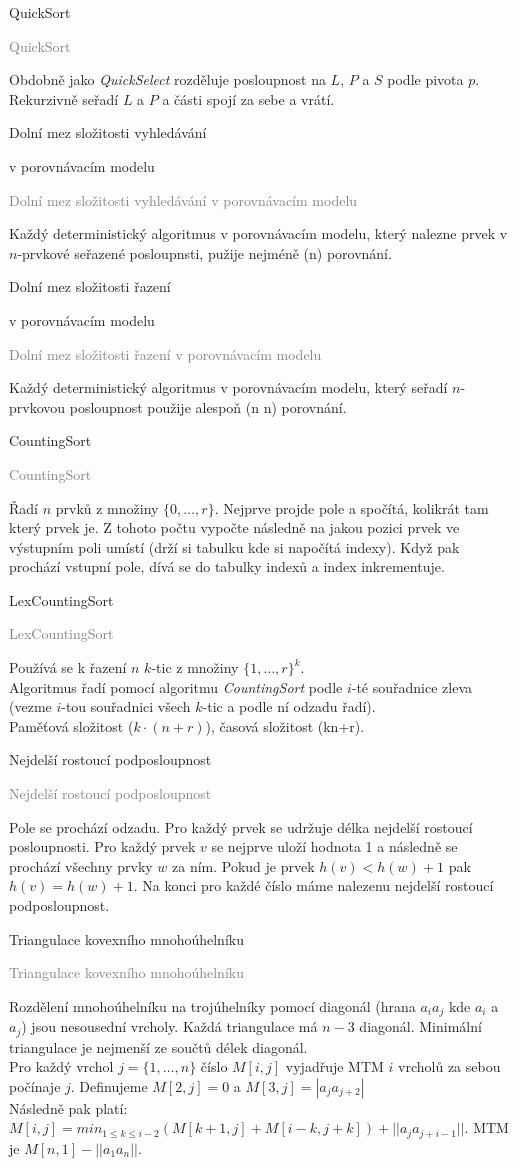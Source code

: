 \documentclass[20pt]{extarticle}
\newcommand{\card}[3][]{
	\vspace*{\fill}

	\newpage
	\topskip0pt
	\vspace*{\fill}
		\Large #2

		\vspace{1cm}
		\normalsize #1
	\vspace*{\fill}
	\newpage

	\small \textcolor{gray}{#2 #1}
	\topskip0pt
	\vspace*{\fill}

	\normalsize
	#3
	\vspace*{\fill}
}
\begin{document}
\begin{center}
\card{QuickSort}{
	Obdobně jako \textit{QuickSelect} rozděluje posloupnost na $L$, $P$ a $S$ podle pivota $p$.
	Rekurzivně seřadí $L$ a $P$ a části spojí za sebe a vrátí.
}

\card[v porovnávacím modelu]{Dolní mez složitosti vyhledávání}{
	Každý deterministický algoritmus v porovnávacím modelu, který nalezne prvek v
	$n$-prvkové seřazené posloupnsti, pužije nejméně \Omega(\log n) porovnání.
}

\card[v porovnávacím modelu]{Dolní mez složitosti řazení}{
	Každý deterministický algoritmus v porovnávacím modelu, který seřadí $n$-prvkovou
	posloupnost použije alespoň \Omega(n \log n) porovnání.
}

\card{CountingSort}{
	Řadí $n$ prvků z množiny $\{0, \dots, r\}$. Nejprve projde pole a spočítá,
	kolikrát tam který prvek je. Z tohoto počtu vypočte následně na jakou pozici
	prvek ve výstupním poli umístí (drží si tabulku kde si napočítá indexy). Když
	pak prochází vstupní pole, dívá se do tabulky indexů a index inkrementuje.
}

\card{LexCountingSort}{
	Používá se k řazení $n$ $k$-tic z množiny $\{1, \dots, r\}^k$.\\
	Algoritmus řadí pomocí algoritmu \textit{CountingSort} podle $i$-té souřadnice
	zleva (vezme $i$-tou souřadnici všech $k$-tic a podle ní odzadu řadí).\\
	Paměťová složitost \Theta($k \cdot (n+r)$), časová složitost \Theta(kn+r).
}

\card{Nejdelší rostoucí podposloupnost}{
	Pole se prochází odzadu. Pro každý prvek se udržuje délka nejdelší rostoucí posloupnosti.
	Pro každý prvek $v$ se nejprve uloží hodnota 1 a následně se prochází všechny prvky $w$ za ním.
	Pokud je prvek $h(v) < h(w) + 1$ pak $h(v) = h(w) + 1$. Na konci pro každé číslo
	máme nalezenu nejdelší rostoucí podposloupnost.
}

\card{Triangulace kovexního mnohoúhelníku}{
	\small
	Rozdělení mnohoúhelníku na trojúhelníky pomocí diagonál (hrana $a_i a_j$ kde
	$a_i$ a $a_j$) jsou nesousední vrcholy. Každá triangulace má $n-3$ diagonál.
	Minimální triangulace je nejmenší ze součtů délek diagonál.\\
	Pro každý vrchol $j = \{1, \dots, n\}$ číslo $M[i, j]$ vyjadřuje MTM $i$ vrcholů
	za sebou počínaje $j$. Definujeme $M[2,j] = 0$ a $M[3, j] = |a_ja_{j+2}|$\\
	Následně pak platí: $M[i,j] = min_{1\leq k\leq i-2}(M[k+1, j] + M[i-k, j+k]) + ||a_ja_{j+i-1}||$.
	MTM je $M[n, 1] - ||a_1a_n||$.
}


\end{center}
\end{document}
